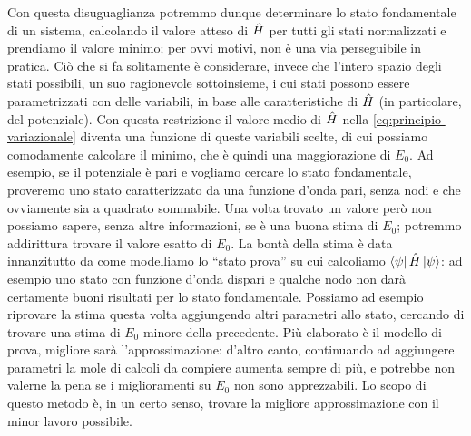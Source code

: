 Con questa disuguaglianza potremmo dunque determinare lo stato fondamentale di un sistema, calcolando il valore atteso di $\hat{H}$ per tutti gli stati normalizzati e prendiamo il valore minimo; per ovvi motivi, non è una via perseguibile in pratica.
Ciò che si fa solitamente è considerare, invece che l'intero spazio degli stati possibili, un suo ragionevole sottoinsieme, i cui stati possono essere parametrizzati con delle variabili, in base alle caratteristiche di $\hat{H}$ (in particolare, del potenziale).
Con questa restrizione il valore medio di $\hat{H}$ nella \eqref{eq:principio-variazionale} diventa una funzione di queste variabili scelte, di cui possiamo comodamente calcolare il minimo, che è quindi una maggiorazione di $E_0$.
Ad esempio, se il potenziale è pari e vogliamo cercare lo stato fondamentale, proveremo uno stato caratterizzato da una funzione d'onda pari, senza nodi e che ovviamente sia a quadrato sommabile.
Una volta trovato un valore però non possiamo sapere, senza altre informazioni, se è una buona stima di $E_0$; potremmo addirittura trovare il valore esatto di $E_0$.
La bontà della stima è data innanzitutto da come modelliamo lo ``stato prova'' su cui calcoliamo $\left\langle{\psi}\right|\hat{H}\left|{\psi}\right\rangle$: ad esempio uno stato con funzione d'onda dispari e qualche nodo non darà certamente buoni risultati per lo stato fondamentale.
Possiamo ad esempio riprovare la stima questa volta aggiungendo altri parametri allo stato, cercando di trovare una stima di $E_0$ minore della precedente.
Più elaborato è il modello di prova, migliore sarà l'approssimazione: d'altro canto, continuando ad aggiungere parametri la mole di calcoli da compiere aumenta sempre di più, e potrebbe non valerne la pena se i miglioramenti su $E_0$ non sono apprezzabili.
Lo scopo di questo metodo è, in un certo senso, trovare la migliore approssimazione con il minor lavoro possibile.

